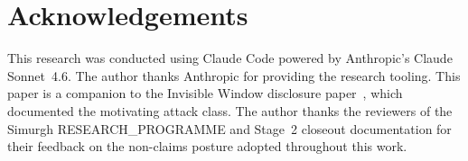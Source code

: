 \documentclass[conference]{IEEEtran}
\begin{document}
\section*{Acknowledgements}

This research was conducted using Claude Code powered by Anthropic's Claude Sonnet~4.6. The author thanks Anthropic for providing the research tooling. This paper is a companion to the Invisible Window disclosure paper~\cite{abedini2026invisible}, which documented the motivating attack class. The author thanks the reviewers of the Simurgh RESEARCH\_PROGRAMME and Stage~2 closeout documentation for their feedback on the non-claims posture adopted throughout this work.

{\sloppy


}
\end{document}
